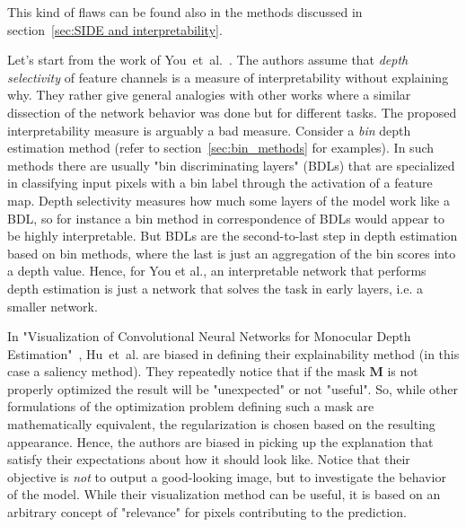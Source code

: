 This kind of flaws can be found also in the methods discussed in section~\ref{sec:SIDE and interpretability}.

\vspace{0.5cm}

Let's start from the work of You~et~al.~\cite{towards_interpretable}.
The authors assume that \textit{depth selectivity} of feature channels is a measure of interpretability without explaining why.
They rather give general analogies with other works where a similar dissection of the network behavior was done but for different tasks.
The proposed interpretability measure is arguably a bad measure.
Consider a \textit{bin} depth estimation method (refer to section~\ref{sec:bin_methods} for examples).
In such methods there are usually "bin discriminating layers" (BDLs) that are specialized in classifying input pixels with a bin label through the activation of a feature map.
Depth selectivity measures how much some layers of the model work like a BDL, so for instance a bin method in correspondence of BDLs would appear to be highly interpretable.
But BDLs are the second-to-last step in depth estimation based on bin methods, where the last is just an aggregation of the bin scores into a depth value.
Hence, for You et al., an interpretable network that performs depth estimation is just a network that solves the task in early layers, i.e. a smaller network.

\vspace{0.5cm}

In "Visualization of Convolutional Neural Networks for Monocular Depth Estimation"~\cite{Hu}, Hu~et~al. are biased in defining their explainability method (in this case a saliency method).
They repeatedly notice that if the mask $\textbf{M}$ is not properly optimized the result will be "unexpected" or not "useful".
So, while other formulations of the optimization problem defining such a mask are mathematically equivalent, the regularization is chosen based on the resulting appearance.
Hence, the authors are biased in picking up the explanation that satisfy their expectations about how it should look like.
Notice that their objective is \textit{not} to output a good-looking image, but to investigate the behavior of the model.
While their visualization method can be useful, it is based on an arbitrary concept of "relevance" for pixels contributing to the prediction.

\vspace{0.5cm}

